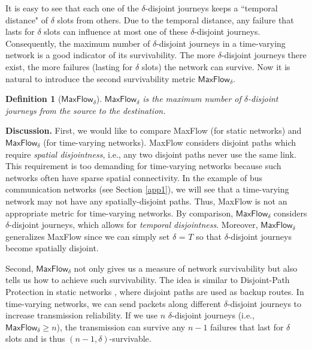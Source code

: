 \documentclass[10pt, conference, letterpaper]{IEEEtran}
\newtheorem{definition}{Definition}
\begin{document}
It is easy to see that each one of the $\delta$-disjoint journeys keeps a ``temporal distance" of $\delta$ slots from others. Due to the temporal distance, any failure that lasts for $\delta$ slots can influence at most one of these $\delta$-disjoint journeys. Consequently, the maximum number of $\delta$-disjoint journeys in a time-varying network is a good indicator of its survivability. The more $\delta$-disjoint journeys there exist, the more failures (lasting for $\delta$ slots) the network can survive. Now it is natural to introduce the second survivability metric $\mathsf{MaxFlow_{\delta}}$.

\begin{definition}[{$\mathsf{MaxFlow_{\delta}}$}]
$\mathsf{MaxFlow_{\delta}}$ is the maximum number of $\delta$-disjoint journeys from the source to the destination.
\end{definition}

\noindent \textbf{Discussion.} First, we would like to compare MaxFlow (for static networks) and $\mathsf{MaxFlow_{\delta}}$ (for time-varying networks). MaxFlow considers disjoint paths which require \emph{spatial disjointness}, i.e., any two disjoint paths never use the same link. This requirement is too demanding for time-varying networks because such networks often have sparse spatial connectivity. In the example of bus communication networks (see Section \ref{app1}), we will see that a time-varying network may not have any spatially-disjoint paths. Thus, MaxFlow is not an appropriate metric for time-varying networks. By comparison, $\mathsf{MaxFlow_{\delta}}$ considers $\delta$-disjoint journeys, which allows for \emph{temporal disjointness}.  Moreover, $\mathsf{MaxFlow_{\delta}}$  generalizes MaxFlow since we can simply set $\delta$ = $T$ so that $\delta$-disjoint journeys become spatially disjoint.

Second, $\mathsf{MaxFlow_{\delta}}$ not only gives us a measure of network survivability but also tells us how to achieve such survivability. The idea is similar to Disjoint-Path Protection in static networks \cite{dis_protect1}\cite{dis_protect2}, where disjoint paths are used as backup routes. In time-varying networks, we can send packets along different $\delta$-disjoint journeys  to increase transmission reliability. If we use $n$ $\delta$-disjoint journeys (i.e., $\mathsf{MaxFlow}_{\delta}\ge n$), the transmission can survive any $n-1$ failures that last for $\delta$ slots and is thus $(n-1,\delta)$-survivable.

\vspace{1mm}
\end{document}
